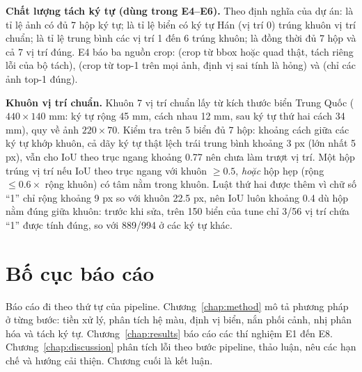 \textbf{Chất lượng tách ký tự (dùng trong E4--E6).} Theo định nghĩa của dự án:  là tỉ lệ ảnh có đủ 7 hộp ký tự;  là tỉ lệ biển có ký tự Hán (vị trí 0) trúng khuôn vị trí chuẩn;  là tỉ lệ trung bình các vị trí 1 đến 6 trúng khuôn;  là đồng thời đủ 7 hộp và cả 7 vị trí đúng. E4 báo ba nguồn crop:  (crop từ bbox hoặc quad thật, tách riêng lỗi của bộ tách),  (crop từ top-1 trên mọi ảnh, định vị sai tính là hỏng) và  (chỉ các ảnh top-1 đúng).

\textbf{Khuôn vị trí chuẩn.} Khuôn 7 vị trí chuẩn lấy từ kích thước biển Trung Quốc ($440\times 140$ mm: ký tự rộng 45 mm, cách nhau 12 mm, sau ký tự thứ hai cách 34 mm), quy về ảnh $220\times 70$. Kiểm tra trên 5 biển  đủ 7 hộp: khoảng cách giữa các ký tự khớp khuôn, cả dãy ký tự thật lệch trái trung bình khoảng 3 px (lớn nhất 5 px), vẫn cho IoU theo trục ngang khoảng 0.77 nên chưa làm trượt vị trí. Một hộp trúng vị trí nếu IoU theo trục ngang với khuôn $\ge 0.5$, \emph{hoặc} hộp hẹp (rộng $\le 0.6\times$ rộng khuôn) có tâm nằm trong khuôn. Luật thứ hai được thêm vì chữ số ``1'' chỉ rộng khoảng 9 px so với khuôn 22.5 px, nên IoU luôn khoảng 0.4 dù hộp nằm đúng giữa khuôn: trước khi sửa, trên 150 biển  của tune chỉ 3/56 vị trí chứa ``1'' được tính đúng, so với 889/994 ở các ký tự khác.

\section{Bố cục báo cáo}

Báo cáo đi theo thứ tự của pipeline. Chương~\ref{chap:method} mô tả phương pháp ở từng bước: tiền xử lý, phân tích hệ màu, định vị biển, nắn phối cảnh, nhị phân hóa và tách ký tự. Chương~\ref{chap:results} báo cáo các thí nghiệm E1 đến E8. Chương~\ref{chap:discussion} phân tích lỗi theo bước pipeline, thảo luận, nêu các hạn chế và hướng cải thiện. Chương cuối là kết luận.
